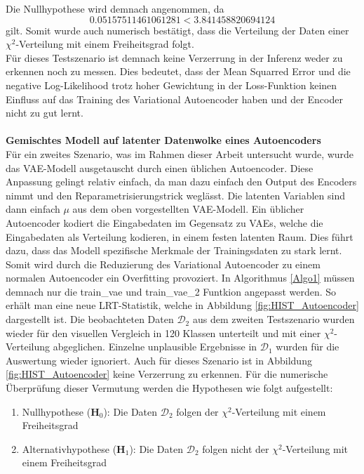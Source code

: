 \documentclass[%
thesis=student,%
coverpage=false,%
titlepage=false,%
headmarks=true, %
german,%
font=libertine, %
math=newpxtx, %
BCOR=5mm,%
coverBCOR=11mm%
]{tumbook}
\theoremstyle{break}
\begin{document}
Die Nullhypothese wird demnach angenommen, da $$0.05157511461061281 < 3.841458820694124$$ gilt. Somit wurde auch numerisch bestätigt, dass die Verteilung der Daten einer $\chi^2$-Verteilung mit einem Freiheitsgrad folgt. 
\\
Für dieses Testszenario ist demnach keine Verzerrung in der Inferenz weder zu erkennen noch zu messen. Dies bedeutet, dass der Mean Squarred Error und die negative Log-Likelihood trotz hoher Gewichtung in der Loss-Funktion keinen Einfluss auf das Training des Variational Autoencoder haben und der Encoder nicht zu gut lernt.\\
\\
\textbf{Gemischtes Modell auf latenter Datenwolke eines Autoencoders}\\
Für ein zweites Szenario, was im Rahmen dieser Arbeit untersucht wurde, wurde das VAE-Modell ausgetauscht durch einen üblichen Autoencoder. Diese Anpassung gelingt relativ einfach, da man dazu einfach den Output des Encoders nimmt und den Reparametrisierungstrick weglässt. Die latenten Variablen sind dann einfach $\mu$ aus dem oben vorgestellten VAE-Modell. Ein üblicher Autoencoder kodiert die Eingabedaten im Gegensatz zu VAEs, welche die Eingabedaten als Verteilung kodieren, in einem festen latenten Raum. Dies führt dazu, dass das Modell spezifische Merkmale der Trainingsdaten zu stark lernt. Somit wird durch die Reduzierung des Variational Autoencoder zu einem normalen Autoencoder ein Overfitting provoziert. In Algorithmus \ref{Algo1} müssen demnach nur die train\_vae und train\_vae\_2 Funtkion angepasst werden. So erhält man eine neue LRT-Statistik, welche in Abbildung \ref{fig:HIST_Autoencoder} dargestellt ist. Die beobachteten Daten $\mathcal{D}_2$ aus dem zweiten Testszenario wurden wieder für den visuellen Vergleich in 120 Klassen unterteilt und mit einer $\chi^2$-Verteilung abgeglichen. Einzelne unplausible Ergebnisse in $\mathcal{D}_1$ wurden für die Auswertung  wieder ignoriert. Auch für dieses Szenario ist in Abbildung \ref{fig:HIST_Autoencoder} keine Verzerrung zu erkennen. Für die numerische Überprüfung dieser Vermutung werden die Hypothesen wie folgt aufgestellt:\\
\begin{enumerate}
	\item Nullhypothese ($\mathbf{H}_0$): Die Daten $\mathcal{D}_2$ folgen der $\chi^2$-Verteilung mit einem Freiheitsgrad\\
	\item Alternativhypothese ($\mathbf{H}_1$): Die Daten $\mathcal{D}_2$ folgen nicht der $\chi^2$-Verteilung mit einem Freiheitsgrad \\
\end{enumerate}
\end{document}
